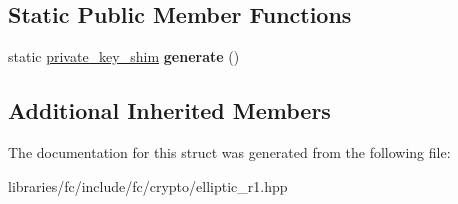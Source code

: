 \subsection*{Static Public Member Functions}
\begin{DoxyCompactItemize}
\item 
\mbox{\label{structfc_1_1crypto_1_1r1_1_1private__key__shim_adca021da556cfe6d75a6fe63f5286f73}} 
static \mbox{\hyperlink{structfc_1_1crypto_1_1r1_1_1private__key__shim}{private\+\_\+key\+\_\+shim}} {\bfseries generate} ()
\end{DoxyCompactItemize}
\subsection*{Additional Inherited Members}


The documentation for this struct was generated from the following file\+:\begin{DoxyCompactItemize}
\item 
libraries/fc/include/fc/crypto/elliptic\+\_\+r1.\+hpp\end{DoxyCompactItemize}
